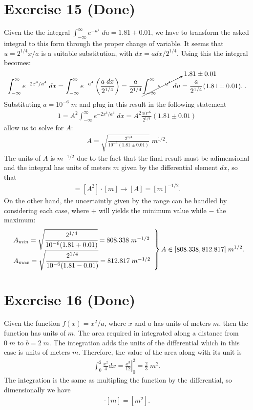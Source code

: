 \documentclass[letterpaper,11pt,twoside]{article}
\begin{document}
\section{Exercise 15 (Done)}
Given the the integral $\int_{-\infty}^\infty e^{-u^4}\;du=1.81\pm0.01$, we have to transform the asked integral to this form through
the proper change of variable. It seems that $u=2^{1/4}x/a$ is a suitable substitution, with $dx=adx/2^{1/4}$. Using this 
the integral becomes:
\begin{align*}
  \int^\infty_{-\infty}e^{-2x^4/a^4}\;dx=\int_{-\infty}^\infty e^{-u^4}\left(\frac{a\;dx}{2^{1/4}}\right)=\frac{a}{2^{1/4}}\cancelto{1.81\pm0.01}{\int_{-\infty}^{\infty}e^{-u^4}\;du}=\frac{a}{2^{1/4}}(1.81\pm0.01).
  \frac{}{}.
\end{align*}
Substituting $a=10^{-6}\;m$ and plug in this result in the following statement
\begin{align}
  1=A^2\int^\infty_{-\infty}e^{-2x^4/a^4}\;dx=A^2\frac{10^{-6}}{2^{1/4}}(1.81\pm0.01)
\end{align}
allow us to solve for $A$:
\begin{align}
  A=\sqrt{\frac{2^{1/4}}{10^{-6}(1.81\pm0.01)}}\;m^{1/2}.
\end{align}
The units of $A$ is $m^{-1/2}$ due to the fact that the final result must be adimensional and the integral has units of meters $m$ given by the differential
element $dx$, so that
\begin{align}
  [-]=[A^2]\cdot[m]\longrightarrow [A]=[m]^{-1/2}.
\end{align}
On the other hand, the uncertaintly given by the range can be handled by considering each case, where $+$ will yields the minimum value while $-$ the maximum:
\begin{align}
  \left.\begin{array}{l}
  A_{min}=\sqrt{\cfrac{2^{1/4}}{10^{-6}(1.81+0.01)}}=808.338\;m^{-1/2}\\
  A_{max}=\sqrt{\cfrac{2^{1/4}}{10^{-6}(1.81-0.01)}}=812.817\;m^{-1/2}
  \end{array}\right\}A\in[808.338,812.817]\;m^{1/2}.
\end{align} 


\section{Exercise 16 (Done)}
Given the function $f(x)=x^2/a$, where $x$ and $a$ has units of meters $m$, then the function has units of $m$.
The area required in integrated along a distance from $0\;m$ to $b=2\;m$. The integration adds the units of the differential
which in this case is units of meters $m$. Therefore, the value of the area along with its unit is
\begin{align}
  \int_0^2\frac{x^2}{4}dx=\left.\frac{x^3}{12}\right|_0^2=\frac{2}{3}\;m^2.
\end{align}
The integration is the same as multipling the function by the differential, so dimensionally we have
\begin{align}
  [m]\cdot[m]=[m^2].
\end{align}
\end{document}
